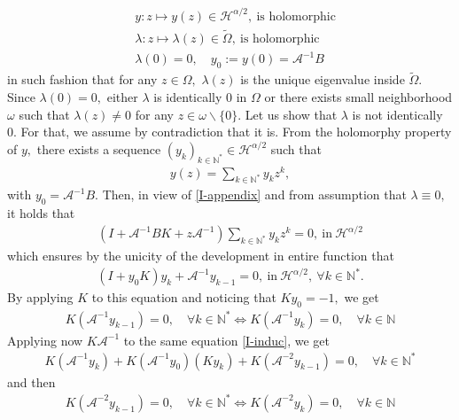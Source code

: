 \documentclass[11pt, dvipsnames]{amsart}
\begin{document}
\begin{itemize}
\begin{enumerate}
\begin{align}
            &y:z\mapsto y(z)\in \mathcal{H}^{\alpha/2},\ \text{is holomorphic}\\
            &\lambda:z\mapsto \lambda(z)\in \tilde\Omega,\ \text{is holomorphic}\\
            &\lambda(0)=0, \quad y_0:=y(0)=\mathcal{A}^{-1}B        
            \end{align} in such fashion that for any $z\in \Omega,$ $\lambda(z)$ is the unique eigenvalue inside $\tilde \Omega.$ Since $\lambda(0)=0,$ either $\lambda$ is identically $0$ in $\Omega$ or there exists small neighborhood $\omega$ such that $\lambda(z)\neq 0$ for any $z\in \omega\smallsetminus\{0\}.$ Let us show that $\lambda$ is not identically $0.$ For that, we assume by contradiction that it is. From the holomorphy property of $y,$ there exists a sequence $(y_k)_{k\in \mathbb{N}^*}\in \mathcal{H}^{\alpha/2}$ such that
            \begin{align*}
                y(z)=\sum_{k\in \mathbb{N}^*}y_k z^k,
            \end{align*} with $y_0=\mathcal{A}^{-1}B.$
    Then, in view of \eqref{I-appendix} and from assumption that $\lambda\equiv0,$ it holds that
    \begin{align*}
       (I+\mathcal{A}^{-1}BK+z\mathcal{A}^{-1}) \sum_{k\in \mathbb{N}^*}y_k z^k=0, \ \text{in}\ \mathcal{H}^{\alpha/2}
    \end{align*} which ensures by the unicity of the development in entire function that
    \begin{align}
        (I+y_0K)y_k+\mathcal{A}^{-1}y_{k-1}=0,\ \text{in}\ \mathcal{H}^{\alpha/2}, \ \forall k\in \mathbb{N}^*.\label{I-induc}
    \end{align}
    By applying $K$ to this equation and noticing that $Ky_0=-1,$ we get
    \begin{align*}
        K(\mathcal{A}^{-1}y_{k-1})=0, \quad \forall k\in \mathbb{N}^*\Leftrightarrow K(\mathcal{A}^{-1}y_{k})=0, \quad \forall k\in \mathbb{N}
    \end{align*}
    Applying now $K\mathcal{A}^{-1}$ to the same equation \eqref{I-induc}, we get
    \begin{align*}
        K(\mathcal{A}^{-1}y_k)+K(\mathcal{A}^{-1}y_0)(Ky_k)+K(\mathcal{A}^{-2}y_{k-1})=0, \quad \forall k\in \mathbb{N}^*
    \end{align*} and then
    \begin{align*}
        K(\mathcal{A}^{-2}y_{k-1})=0, \quad \forall k\in \mathbb{N}^*\Leftrightarrow K(\mathcal{A}^{-2}y_{k})=0, \quad \forall k\in \mathbb{N}

\end{align*}
\end{enumerate}
\end{itemize}
\end{document}
